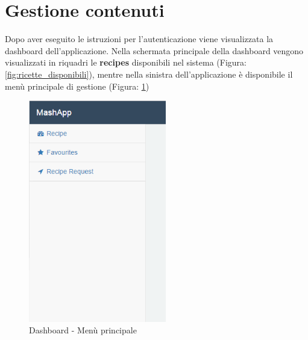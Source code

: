 %


\section{Gestione contenuti} %
\label{sec:gestione_contenuti}
	Dopo aver eseguito le istruzioni per l'autenticazione viene visualizzata la dashboard dell’applicazione.\newline
	Nella schermata principale della dashboard vengono visualizzati in riquadri le \textbf{recipes} disponibili nel sistema (Figura: \ref{fig:ricette_disponibili}), mentre nella sinistra dell'applicazione è disponibile il menù principale di gestione (Figura: \ref{fig:menu_principale_utente})
	\begin{figure}[H]
		\centering
		\centerline{\includegraphics[width=6cm]{images/menu_principale_utente.png}}
		\caption{Dashboard - Menù principale}
		\label{fig:menu_principale_utente}
	\end{figure}



